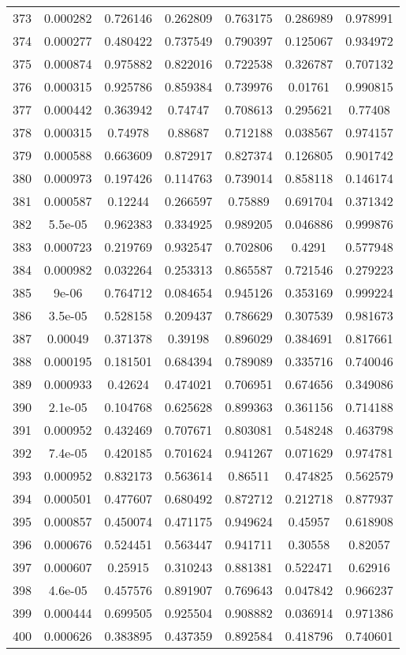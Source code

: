 \begin{table}
\begin{tabular}{c|c|c|c|c|c|c}
373 & 0.000282 & 0.726146 & 0.262809 & 0.763175 & 0.286989 & 0.978991\\
374 & 0.000277 & 0.480422 & 0.737549 & 0.790397 & 0.125067 & 0.934972\\
375 & 0.000874 & 0.975882 & 0.822016 & 0.722538 & 0.326787 & 0.707132\\
376 & 0.000315 & 0.925786 & 0.859384 & 0.739976 & 0.01761 & 0.990815\\
377 & 0.000442 & 0.363942 & 0.74747 & 0.708613 & 0.295621 & 0.77408\\
378 & 0.000315 & 0.74978 & 0.88687 & 0.712188 & 0.038567 & 0.974157\\
379 & 0.000588 & 0.663609 & 0.872917 & 0.827374 & 0.126805 & 0.901742\\
380 & 0.000973 & 0.197426 & 0.114763 & 0.739014 & 0.858118 & 0.146174\\
381 & 0.000587 & 0.12244 & 0.266597 & 0.75889 & 0.691704 & 0.371342\\
382 & 5.5e-05 & 0.962383 & 0.334925 & 0.989205 & 0.046886 & 0.999876\\
383 & 0.000723 & 0.219769 & 0.932547 & 0.702806 & 0.4291 & 0.577948\\
384 & 0.000982 & 0.032264 & 0.253313 & 0.865587 & 0.721546 & 0.279223\\
385 & 9e-06 & 0.764712 & 0.084654 & 0.945126 & 0.353169 & 0.999224\\
386 & 3.5e-05 & 0.528158 & 0.209437 & 0.786629 & 0.307539 & 0.981673\\
387 & 0.00049 & 0.371378 & 0.39198 & 0.896029 & 0.384691 & 0.817661\\
388 & 0.000195 & 0.181501 & 0.684394 & 0.789089 & 0.335716 & 0.740046\\
389 & 0.000933 & 0.42624 & 0.474021 & 0.706951 & 0.674656 & 0.349086\\
390 & 2.1e-05 & 0.104768 & 0.625628 & 0.899363 & 0.361156 & 0.714188\\
391 & 0.000952 & 0.432469 & 0.707671 & 0.803081 & 0.548248 & 0.463798\\
392 & 7.4e-05 & 0.420185 & 0.701624 & 0.941267 & 0.071629 & 0.974781\\
393 & 0.000952 & 0.832173 & 0.563614 & 0.86511 & 0.474825 & 0.562579\\
394 & 0.000501 & 0.477607 & 0.680492 & 0.872712 & 0.212718 & 0.877937\\
395 & 0.000857 & 0.450074 & 0.471175 & 0.949624 & 0.45957 & 0.618908\\
396 & 0.000676 & 0.524451 & 0.563447 & 0.941711 & 0.30558 & 0.82057\\
397 & 0.000607 & 0.25915 & 0.310243 & 0.881381 & 0.522471 & 0.62916\\
398 & 4.6e-05 & 0.457576 & 0.891907 & 0.769643 & 0.047842 & 0.966237\\
399 & 0.000444 & 0.699505 & 0.925504 & 0.908882 & 0.036914 & 0.971386\\
400 & 0.000626 & 0.383895 & 0.437359 & 0.892584 & 0.418796 & 0.740601\\
\end{tabular}
\end{table}
